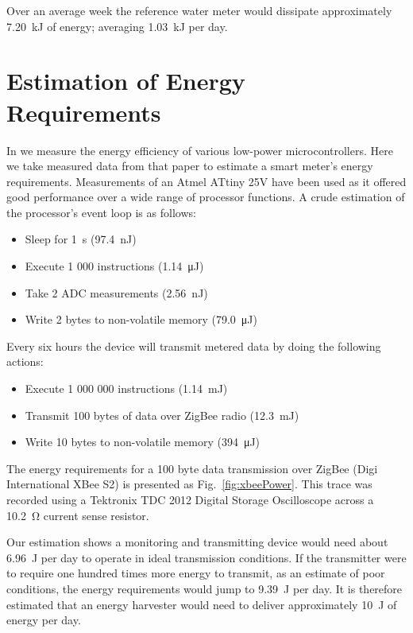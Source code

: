 \documentclass[10pt,final,journal]{IEEEtran}
\begin{document}
    Over an average week the reference water meter would dissipate approximately \SI{7.20}{\kilo\joule} of energy; averaging \SI{1.03}{\kilo\joule} per day.

    \section{Estimation of Energy Requirements}
    \label{sect:powerRequirements}
    In \cite{Jones2011} we measure the energy efficiency of various low-power microcontrollers.
    Here we take measured data from that paper to estimate a smart meter's energy requirements.
    Measurements of an Atmel ATtiny 25V have been used as it offered good performance over a wide range of processor functions.
    A crude estimation of the processor's event loop is as follows:
    \begin{itemize}
    \item Sleep for \SI{1}{\second} (\SI{97.4}{\nano\joule})
    \item Execute 1 000 instructions (\SI{1.14}{\micro\joule})
    \item Take 2 ADC measurements (\SI{2.56}{\nano\joule})
    \item Write 2 bytes to non-volatile memory (\SI{79.0}{\micro\joule})
    \end{itemize}
    Every six hours the device will transmit metered data by doing the following actions:
    \begin{itemize}
    \item Execute 1 000 000 instructions (\SI{1.14}{\milli\joule})
    \item Transmit 100 bytes of data over ZigBee radio (\SI{12.3}{\milli\joule})
    \item Write 10 bytes to non-volatile memory (\SI{394}{\micro\joule})
    \end{itemize}

    The energy requirements for a 100 byte data transmission over ZigBee (Digi International XBee S2) is presented as Fig.~\ref{fig:xbeePower}.
    This trace was recorded using a Tektronix TDC 2012 Digital Storage Oscilloscope across a \SI{10.2}{\ohm} current sense resistor.

    Our estimation shows a monitoring and transmitting device would need about \SI{6.96}{\joule} per day to operate in ideal transmission conditions.
    If the transmitter were to require one hundred times more energy to transmit, as an estimate of poor conditions, the energy requirements would jump to \SI{9.39}{\joule} per day.
    It is therefore estimated that an energy harvester would need to deliver approximately \SI{10}{\joule} of energy per day.
\end{document}

